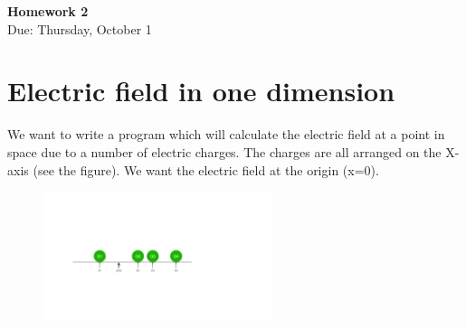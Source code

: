 \documentclass{article}
\begin{document}
\fancyfoot[C]{\thepage}
\vspace*{0cm}
\begin{center}
	{\LARGE \textbf{Homework 2}}\\
	\vspace{0.25cm}
	{\Large Due: Thursday, October 1}
\end{center}

\section*{Electric field in one dimension}
We want to write a program which will calculate the electric field at a point in space due to a number of electric charges. The charges are all arranged on the X-axis (see the figure). We want the electric field at the origin (x=0).

\begin{figure}[ht!]
	\centering
	\includegraphics[width=0.6\textwidth]{hw2_sketch}
\end{figure}
\end{document}

